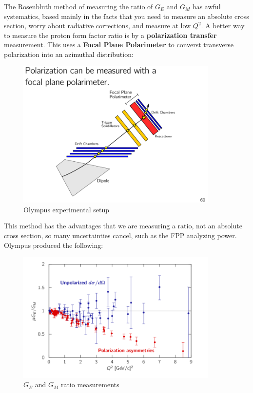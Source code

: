                 
            The Rosenbluth method of measuring the ratio of $G_E$ and $G_M$ has awful systematics, based mainly in the facts that you need to measure an absolute cross section, worry about radiative corrections, and measure at low $Q^2$. A better way to measure the proton form factor ratio is by a \textbf{polarization transfer} measurement. This uses a \textbf{Focal Plane Polarimeter} to converst transverse polarization into an azimuthal distribution:
            
                  
            \begin{figure}[H]
                \centering
                \includegraphics[width=10cm]{Chapters/Ch1-Intro/Ch1-Sec1-Background/pics/elastic-ep/olympus-fpp.PNG}
                \caption{Olympus experimental setup}
            \end{figure}
            
            This method has the advantages that we are measuring a ratio, not an absolute cross section, so many uncertainties cancel, such as the FPP analyzing power. Olympus produced the following:
            
                  
            \begin{figure}[H]
                \centering
                \includegraphics[width=10cm]{Chapters/Ch1-Intro/Ch1-Sec1-Background/pics/elastic-ep/olympus-form-factors.PNG}
                \caption{$G_E$ and $G_M$ ratio measurements}
            \end{figure}
            
